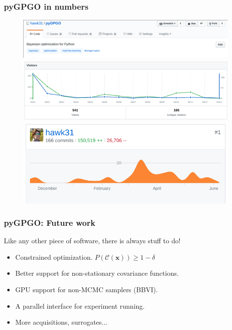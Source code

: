 \documentclass[10pt,usenames,dvipsnames]{beamer}
\begin{document}
\begin{frame}
\frametitle{pyGPGO in numbers}
\begin{figure}
\includegraphics[width=\textwidth]{figures/pygpgo_git}\\
\includegraphics[width=\textwidth]{figures/visits}\\
\includegraphics[scale=0.3]{figures/commits}
\end{figure}
\end{frame}

\begin{frame}
\frametitle{pyGPGO: Future work}
Like any other piece of software, there is always stuff to do!
\begin{itemize}
\item Constrained optimization. $P\left(\mathcal{C}(\boldsymbol{x})\right) \geq 1 - \delta$
\item Better support for non-stationary covariance functions.
\item GPU support for non-MCMC samplers (BBVI).
\item A parallel interface for experiment running.
\item More acquisitions, surrogates...
\end{itemize}
\end{frame}
\end{document}
